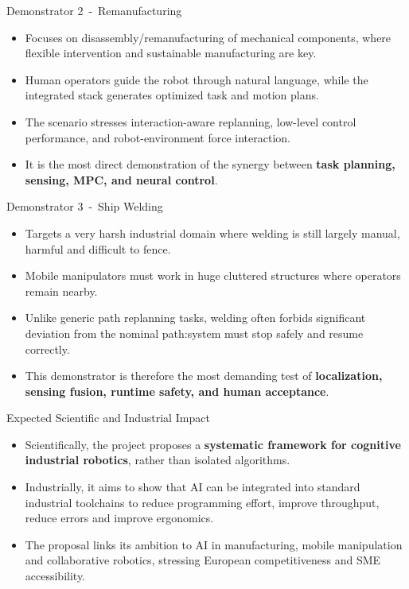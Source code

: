 \documentclass[aspectratio=169,10pt]{beamer}
\begin{document}
\begin{frame}{Demonstrator 2~-~Remanufacturing}

\begin{itemize}
  \item Focuses on disassembly/remanufacturing of mechanical components, where flexible intervention and sustainable manufacturing are key.
  \item Human operators guide the robot through natural language, while the integrated stack generates optimized task and motion plans.
  \item The scenario stresses interaction-aware replanning, low-level control performance, and robot-environment force interaction.
  \item It is the most direct demonstration of the synergy between \textbf{task planning, sensing, MPC, and neural control}. 
\end{itemize}

\end{frame}


\begin{frame}{Demonstrator 3~-~Ship Welding}

\begin{itemize}
  \item Targets a very harsh industrial domain where welding is still largely manual, harmful and difficult to fence.
  \item Mobile manipulators must work in huge cluttered structures where operators remain nearby.
  \item Unlike generic path replanning tasks, welding often forbids significant deviation from the nominal path:\@the system must stop safely and resume correctly.
  \item This demonstrator is therefore the most demanding test of \textbf{localization, sensing fusion, runtime safety, and human acceptance}. 
\end{itemize}

\end{frame}


\begin{frame}{Expected Scientific and Industrial Impact}

\begin{itemize}
  \item Scientifically, the project proposes a \textbf{systematic framework for cognitive industrial robotics}, rather than isolated algorithms.
  \item Industrially, it aims to show that AI can be integrated into standard industrial toolchains to reduce programming effort, improve throughput, reduce errors and improve ergonomics.
  \item The proposal links its ambition to AI in manufacturing, mobile manipulation and collaborative robotics, stressing European competitiveness and SME accessibility.
\end{itemize}

\end{frame}
\end{document}
